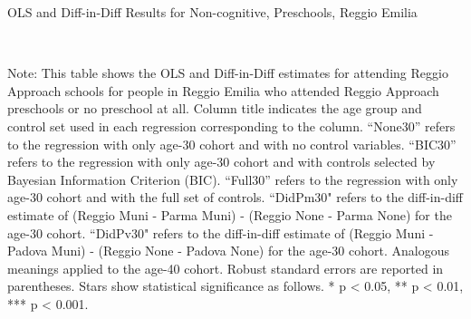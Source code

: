 \begin{landscape}
\begin{table}[H] \caption{OLS and Diff-in-Diff Results for Non-cognitive, Preschools, Reggio Emilia} \label{ols-N-reg}
\scalebox{0.85}{
}
\vspace{1ex} \\
\footnotesize\raggedright{Note: This table shows the OLS and Diff-in-Diff estimates for attending Reggio Approach schools for people in Reggio Emilia who attended Reggio Approach preschools or no preschool at all. Column title indicates the age group and control set used in each regression corresponding to the column. ``None30'' refers to the regression with only age-30 cohort and with no control variables. ``BIC30'' refers to the regression with only age-30 cohort and with controls selected by Bayesian Information Criterion (BIC). ``Full30'' refers to the regression with only age-30 cohort and with the full set of controls. ``DidPm30" refers to the diff-in-diff estimate of (Reggio Muni - Parma Muni) - (Reggio None - Parma None) for the age-30 cohort. ``DidPv30" refers to the diff-in-diff estimate of (Reggio Muni - Padova Muni) - (Reggio None - Padova None) for the age-30 cohort. Analogous meanings applied to the age-40 cohort. Robust standard errors are reported in parentheses. Stars show statistical significance as follows. * p < 0.05, ** p < 0.01, *** p < 0.001.}
\end{table}



\end{landscape}
